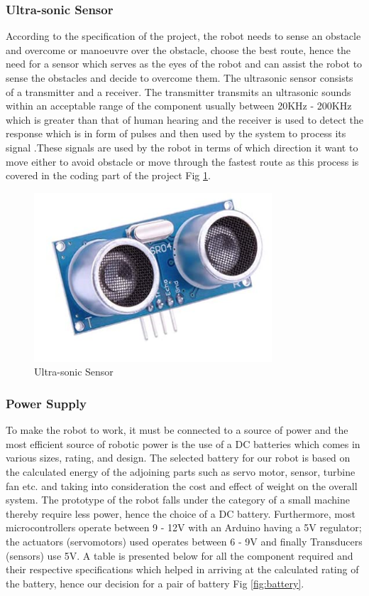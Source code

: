 \documentclass[10pt,journal,compsoc]{IEEEtran}
\begin{document}
\subsubsection{Ultra-sonic Sensor}

According to the specification of the project, the robot needs to sense an obstacle and overcome or manoeuvre over the obstacle, choose the best route, hence the need for a sensor which serves as the eyes of the robot and can assist the robot to sense the obstacles and decide to overcome them. The ultrasonic sensor consists of a transmitter and a receiver. The transmitter transmits an ultrasonic sounds within an acceptable range of the component usually between 20KHz - 200KHz which is greater than that of human hearing and the receiver is used to detect the response which is in form of pulses and then used by the system to process its signal .These signals are used by the robot in terms of which direction it want to move either to avoid obstacle or move through the fastest route as this process is covered in the coding part of the project \cite{ultrasonic} Fig \ref{fig:ultrasonic}.


\begin{figure}[h]
\includegraphics[scale=0.80]{ultrasonic}
\caption{Ultra-sonic Sensor}
\label{fig:ultrasonic}
\end{figure}

\subsubsection{Power Supply}

To make the robot to work, it must be connected to a source of power and the most efficient source of robotic power is the use of a DC batteries which comes in various sizes, rating, and design. The selected battery for our robot is based on the calculated energy of the adjoining parts such as servo motor, sensor, turbine fan etc. and taking into consideration the cost and effect of weight on the overall system. The prototype of the robot falls under the category of a small machine thereby require less power, hence the choice of a DC battery. Furthermore, most microcontrollers operate between 9 - 12V with an Arduino having a 5V regulator; the actuators (servomotors) used operates between 6 - 9V and finally Transducers (sensors) use 5V. A table is presented below for all the component required and their respective specifications which helped in arriving at the calculated rating of the battery, hence our decision for a pair of battery Fig \ref{fig:battery}.
\end{document}
